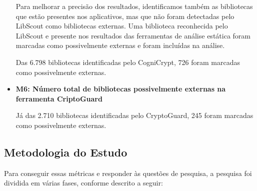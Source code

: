 \begin{itemize}
Para melhorar a precisão dos resultados, identificamos também as bibliotecas que estão presentes nos aplicativos, mas que não foram detectadas pelo LibScout como bibliotecas externas. Uma biblioteca reconhecida pelo LibScout e presente nos resultados das ferramentas de análise estática foram marcadas como possivelmente externas e foram incluídas na análise.

Das 6.798 bibliotecas identificadas pelo CogniCrypt, 726 foram marcadas como possivelmente externas.

\item \textbf{M6: Número total de bibliotecas possivelmente externas na ferramenta CriptoGuard} \

Já das 2.710 bibliotecas identificadas pelo CryptoGuard, 245 foram marcadas como possivelmente externas.


\end{itemize}

\subsection{Metodologia do Estudo}

Para conseguir essas métricas e responder às questões de pesquisa, a pesquisa foi dividida em várias fases, conforme descrito a seguir:

